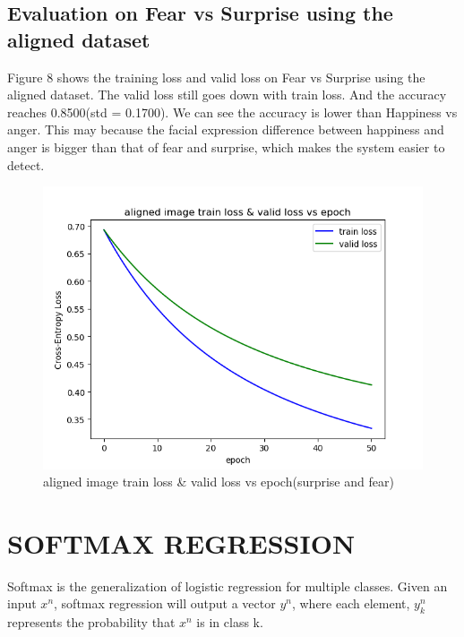 \documentclass{article} %
\begin{document}
\subsection {Evaluation on Fear vs Surprise using the aligned dataset}
Figure 8 shows the training loss and valid loss on Fear vs Surprise using the aligned dataset. The valid loss still goes down with train loss. And the accuracy reaches 0.8500(std = 0.1700). We can see the accuracy is lower than Happiness vs anger. This may because the facial expression difference between happiness and anger is bigger than that of fear and surprise, which makes the system easier to detect. 
\begin{figure}[h]
	\centering
	\includegraphics[scale=0.5]{./graph/aligned_angerfear.png}
	\caption{aligned image train loss \& valid loss vs epoch(surprise and fear)}
\end{figure}

\section{SOFTMAX REGRESSION}
Softmax is the generalization of logistic regression for multiple classes. Given an input $x^n$, softmax regression will output a vector $y^n$, where each element, $y_k^n$ represents the probability that $x^n$ is in class k.
\end{document}
